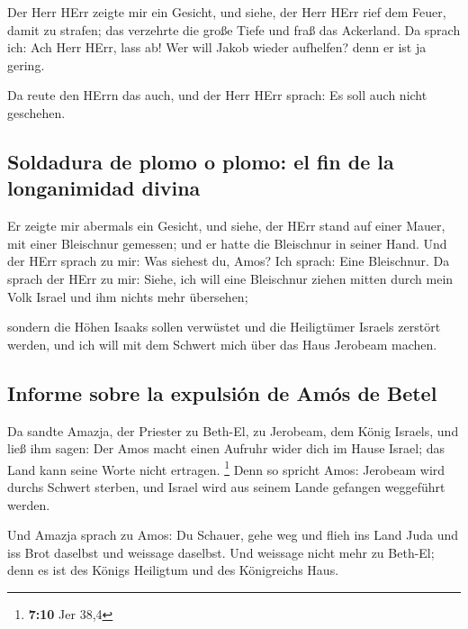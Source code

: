  Der Herr HErr zeigte mir ein Gesicht, und siehe, der Herr
HErr rief dem Feuer, damit zu strafen; das verzehrte die große Tiefe und
fraß das Ackerland.  Da sprach ich: Ach Herr HErr, lass
ab! Wer will Jakob wieder aufhelfen? denn er ist ja gering.

 Da reute den HErrn das auch, und der Herr HErr sprach: Es
soll auch nicht geschehen.

\hypertarget{soldadura-de-plomo-o-plomo-el-fin-de-la-longanimidad-divina}{%
\subsection{Soldadura de plomo o plomo: el fin de la longanimidad
divina}\label{soldadura-de-plomo-o-plomo-el-fin-de-la-longanimidad-divina}}

 Er zeigte mir abermals ein Gesicht, und siehe, der HErr
stand auf einer Mauer, mit einer Bleischnur gemessen; und er hatte die
Bleischnur in seiner Hand.  Und der HErr sprach zu mir:
Was siehest du, Amos? Ich sprach: Eine Bleischnur. Da sprach der HErr zu
mir: Siehe, ich will eine Bleischnur ziehen mitten durch mein Volk
Israel und ihm nichts mehr übersehen;

 sondern die Höhen Isaaks sollen verwüstet und die
Heiligtümer Israels zerstört werden, und ich will mit dem Schwert mich
über das Haus Jerobeam machen.

\hypertarget{informe-sobre-la-expulsiuxf3n-de-amuxf3s-de-betel}{%
\subsection{Informe sobre la expulsión de Amós de
Betel}\label{informe-sobre-la-expulsiuxf3n-de-amuxf3s-de-betel}}

 Da sandte Amazja, der Priester zu Beth-El, zu Jerobeam,
dem König Israels, und ließ ihm sagen: Der Amos macht einen Aufruhr
wider dich im Hause Israel; das Land kann seine Worte nicht ertragen.
\footnote{\textbf{7:10} Jer 38,4}  Denn so spricht Amos:
Jerobeam wird durchs Schwert sterben, und Israel wird aus seinem Lande
gefangen weggeführt werden.

 Und Amazja sprach zu Amos: Du Schauer, gehe weg und
flieh ins Land Juda und iss Brot daselbst und weissage daselbst.
 Und weissage nicht mehr zu Beth-El; denn es ist des
Königs Heiligtum und des Königreichs Haus.

